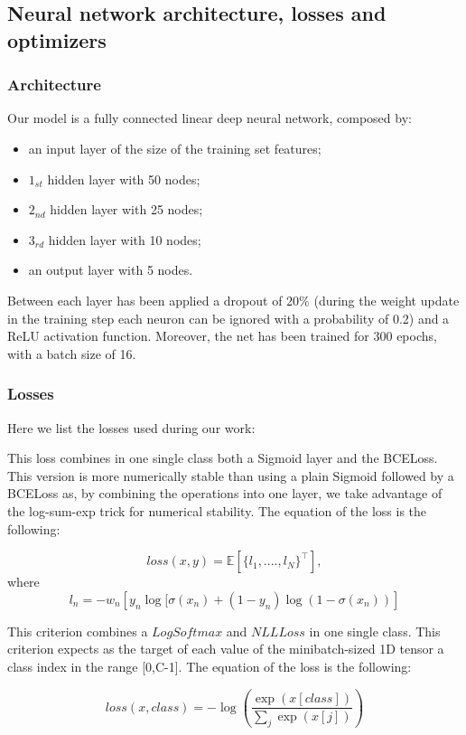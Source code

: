 \documentclass[12pt]{article}
\begin{document}
\subsection{Neural network architecture, losses and optimizers}



\subsubsection{Architecture}
Our model is a fully connected linear deep neural network, composed by:

\begin{itemize}
\item an input layer of the size of the training set features;
\item $1_{st}$ hidden layer with 50 nodes;
\item $2_{nd}$ hidden layer with 25 nodes;
\item $3_{rd}$ hidden layer with 10 nodes;
\item an output layer with 5 nodes.
\end{itemize}
Between each layer has been applied a dropout of $20\%$ (during the weight update in the training step each neuron can be ignored with a probability of 0.2) and a ReLU activation function. Moreover, the net has been trained for 300 epochs, with a batch size of 16.


\subsubsection{Losses}
Here we list the losses used during our work:

\begin{description}[align=left]

\item [BCEWithLogitsLoss:] This loss combines in one single class both a Sigmoid layer and the BCELoss. This version is more numerically stable than using a plain Sigmoid followed by a BCELoss as, by combining the operations into one layer, we take advantage of the log-sum-exp trick for numerical stability. The equation of the loss is the following:

\begin{equation}
loss(x,y) = \mathbb{E} \left[ \{ l_1,....,l_N\} ^\top \right] , 
\end{equation}
where
\begin{equation}
l_{n} = - w_{n} \left[ y_{n}  \log[\sigma(x_{n}) + (1-y_{n})  \log(1 - \sigma(x_{n})) \right]
\end{equation}

\item [CrossEntropyLoss:] This criterion combines a $LogSoftmax$ and $NLLLoss$ in one single class. This criterion expects as the target of each value of the minibatch-sized 1D tensor a class index in the range [0,C-1]. The equation of the loss is the following:

\begin{equation}
loss(x,class) = - \log\left(\frac{\exp(x[class])}{\sum_{j}{\exp(x[j])}}\right)
\end{equation}

\end{description}
\end{document}

